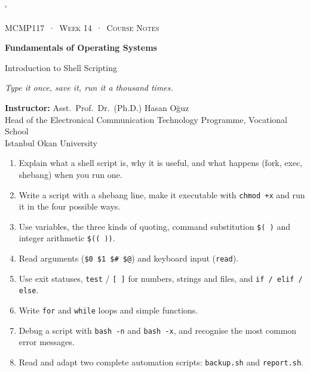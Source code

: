 \documentclass[11pt,a4paper]{article}
\begin{document}
\lstMakeShortInline[style=inl]`

\thispagestyle{empty}
\begin{tcolorbox}[enhanced,colback=dark,colframe=dark,arc=0pt,boxrule=0pt,
  left=18pt,right=18pt,top=20pt,bottom=20pt,coltext=white]
{\small\color{mint}\textsc{MCMP117 \,·\, Week 14 \,·\, Course Notes}}\par\medskip
{\headfont\fontsize{26}{30}\selectfont\bfseries Fundamentals of Operating Systems}\par\medskip
{\large Introduction to Shell Scripting}\par\smallskip
{\small\itshape\color{white!70} Type it once, save it, run it a thousand times.}
\end{tcolorbox}

\vspace{0.4em}
{\small
\textbf{Instructor:} Asst.\ Prof.\ Dr.\ (Ph.D.) Hasan Oğuz\\
Head of the Electronical Communication Technology Programme, Vocational School\\
Istanbul Okan University\par}

\vspace{0.8em}
\begin{keyidea}
\begin{enumerate}[leftmargin=1.4em]
  \item Explain what a shell script is, why it is useful, and what happens (fork, exec, shebang) when you run one.
  \item Write a script with a shebang line, make it executable with \texttt{chmod +x} and run it in the four possible ways.
  \item Use variables, the three kinds of quoting, command substitution \texttt{\$( )} and integer arithmetic \texttt{\$(( ))}.
  \item Read arguments (\texttt{\$0 \$1 \$\# \$@}) and keyboard input (\texttt{read}).
  \item Use exit statuses, \texttt{test} / \texttt{[ ]} for numbers, strings and files, and \texttt{if / elif / else}.
  \item Write \texttt{for} and \texttt{while} loops and simple functions.
  \item Debug a script with \texttt{bash -n} and \texttt{bash -x}, and recognise the most common error messages.
  \item Read and adapt two complete automation scripts: \texttt{backup.sh} and \texttt{report.sh}.
\end{enumerate}
\end{keyidea}
\end{document}
